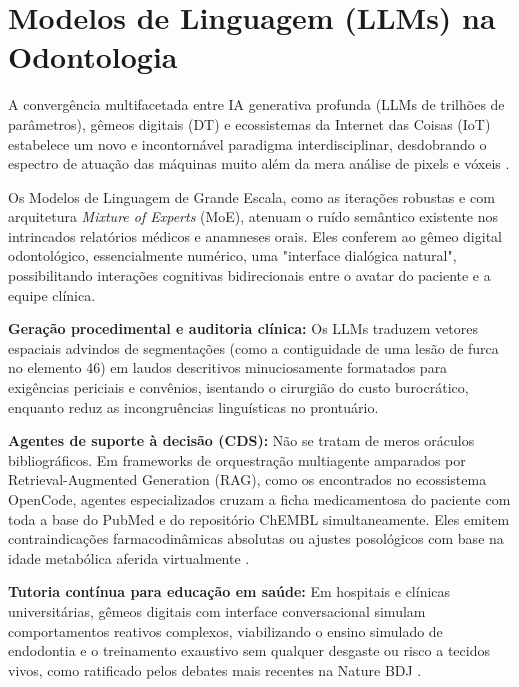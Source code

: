 \section{Modelos de Linguagem (LLMs) na Odontologia}
\label{sec:ia-llms}

A convergência multifacetada entre IA generativa profunda (LLMs de trilhões de parâmetros), gêmeos digitais (DT) e ecossistemas da Internet das Coisas (IoT) estabelece um novo e incontornável paradigma interdisciplinar, desdobrando o espectro de atuação das máquinas muito além da mera análise de pixels e vóxeis \cite{mdpi2025digital}. 

Os Modelos de Linguagem de Grande Escala, como as iterações robustas e com arquitetura \textit{Mixture of Experts} (MoE), atenuam o ruído semântico existente nos intrincados relatórios médicos e anamneses orais. Eles conferem ao gêmeo digital odontológico, essencialmente numérico, uma "interface dialógica natural", possibilitando interações cognitivas bidirecionais entre o avatar do paciente e a equipe clínica.

\textbf{Geração procedimental e auditoria clínica:} Os LLMs traduzem vetores espaciais advindos de segmentações (como a contiguidade de uma lesão de furca no elemento 46) em laudos descritivos minuciosamente formatados para exigências periciais e convênios, isentando o cirurgião do custo burocrático, enquanto reduz as incongruências linguísticas no prontuário.

\textbf{Agentes de suporte à decisão (CDS):} Não se tratam de meros oráculos bibliográficos. Em frameworks de orquestração multiagente amparados por Retrieval-Augmented Generation (RAG), como os encontrados no ecossistema OpenCode, agentes especializados cruzam a ficha medicamentosa do paciente com toda a base do PubMed e do repositório ChEMBL simultaneamente. Eles emitem contraindicações farmacodinâmicas absolutas ou ajustes posológicos com base na idade metabólica aferida virtualmente \cite{technologysociety2025}.

\textbf{Tutoria contínua para educação em saúde:} Em hospitais e clínicas universitárias, gêmeos digitais com interface conversacional simulam comportamentos reativos complexos, viabilizando o ensino simulado de endodontia e o treinamento exaustivo sem qualquer desgaste ou risco a tecidos vivos, como ratificado pelos debates mais recentes na Nature BDJ \cite{naturebdj2026}.
